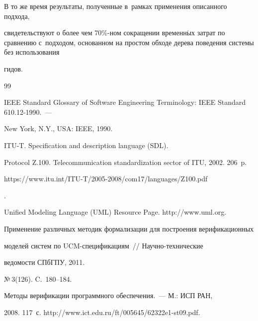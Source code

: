    В то же время результаты, полученные в~рамках применения описанного подхода,


свидетельствуют о более чем 70\%-ном сокращении временн$\acute{\mbox{ы}}$х затрат по сравнению с~подходом, основанном на простом обходе дерева поведения системы без использования


гидов.





{\small\frenchspacing


{%




\begin{thebibliography}{99}




IEEE Standard Glossary of Software Engineering Terminology: IEEE Standard 610.12-1990.~---


New York, N.Y., USA: IEEE, 1990.




ITU-T. Specification and description language (SDL).


Protocol Z.100. Telecommunication standardization sector of ITU, 2002. 206~p. {\sf


https://www.itu.int/ITU-T/2005-2008/com17/languages/Z100.pdf}.




Unified Modeling Language (UML) Resource Page. {\sf  http://www.uml.org}.






 Применение различных методик формализации для построения верификационных


 моделей сис\-тем по UCM-спе\-ци\-фи\-ка\-ци\-ям~/\!\!/ Научно-технические


 ведомости СПбГПУ, 2011. %


 №\,3(126). C.~180--184.







 Методы верификации программного обеспечения.~--- М.: ИСП РАН,


2008. 117~с. {\sf http://www.ict.edu.ru/ft/005645/62322e1-st09.pdf}.





\end{thebibliography}}}
